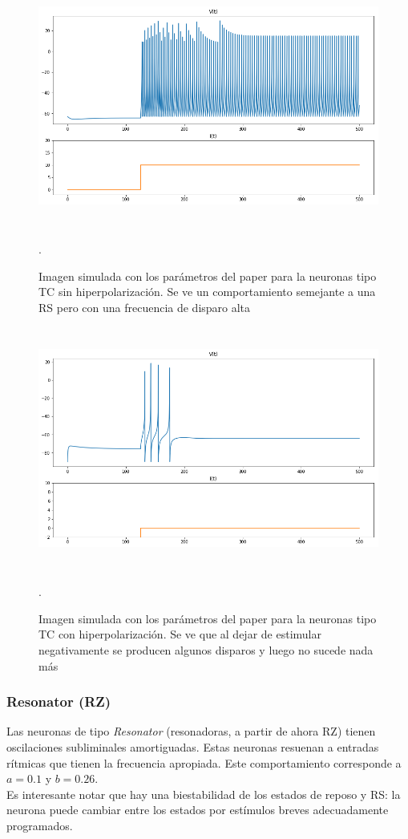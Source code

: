 \documentclass[12pt]{article}
\begin{document}
\begin{figure}[h!]
    \centering
        \includegraphics[height=8cm]{images/TC_normal.png}
    \caption[fontsize=2pt]{Imagen simulada con los parámetros del paper para la neuronas tipo TC sin hiperpolarización. Se ve un comportamiento semejante a una RS pero con una frecuencia de disparo alta}.
\end{figure}
\newpage

\begin{figure}[h!]
    \centering
        \includegraphics[height=8cm]{images/TC_hiper.png}
    \caption[fontsize=2pt]{Imagen simulada con los parámetros del paper para la neuronas tipo TC con hiperpolarización. Se ve que al dejar de estimular negativamente se producen algunos disparos y luego no sucede nada más}.
\end{figure}
\newpage

\subsubsection{Resonator (RZ)}
Las neuronas de tipo \textit{Resonator} (resonadoras, a partir de ahora RZ) tienen oscilaciones subliminales amortiguadas. Estas neuronas resuenan a entradas rítmicas que tienen la frecuencia apropiada.
Este comportamiento corresponde a $a = 0.1$ y $b = 0.26$. \\
Es interesante notar que hay una biestabilidad de los estados de reposo y RS: la neurona puede cambiar entre los estados por estímulos breves adecuadamente programados.
\end{document}
